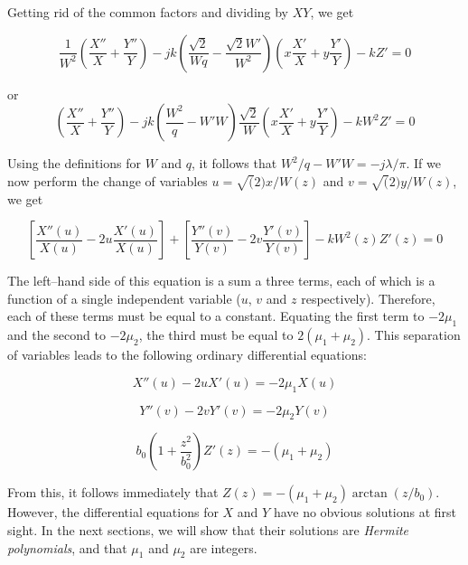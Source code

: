 Getting rid of the common factors and dividing by $XY$, we get

\begin{equation}
\frac{1}{W^2}\left(\frac{X''}{X}+\frac{Y''}{Y}\right)  
- j k \left(\frac{\sqrt{2}}{Wq} - \frac{\sqrt{2}W'}{W^2}\right)\left(x\frac{X'}{X}+y\frac{Y'}{Y}\right)
-kZ' = 0
\end{equation} 

or
\begin{equation}
\left(\frac{X''}{X}+\frac{Y''}{Y}\right)  
- j k  \left(\frac{W^2}{q} - W'W\right)\frac{\sqrt{2}}{W}\left(x\frac{X'}{X}+y\frac{Y'}{Y}\right)
-kW^2Z' = 0
\end{equation} 

Using the definitions for $W$ and $q$, it follows that $W^2/q - W'W = -j \lambda / \pi$. If we now perform the change of variables $u = \sqrt(2) x / W(z)$ and  $v = \sqrt(2) y / W(z)$, we get

\begin{equation}
\left[{\frac{X''(u)}{X(u)} - 2 u\frac{X'(u)}{X(u)}}\right] + 
\left[{\frac{Y''(v)}{Y(v)} - 2 v\frac{Y'(v)}{Y(v)}}\right] -kW^2(z)Z'(z) = 0
\end{equation} 

The left--hand side of this equation is a sum a three terms, each of which is a function of a single independent variable ($u$, $v$ and $z$ respectively). Therefore, each of these terms must be equal to a constant. Equating the first term to $-2\mu_1$ and the second to $-2\mu_2$, the third must be equal to $2(\mu_1+\mu_2)$. This separation of variables leads to the following ordinary differential equations:

\begin{equation}
X''(u) - 2 u X'(u) = - 2 \mu_1 X(u) \label{eq-diff-hermite-0}
\end{equation} 

\begin{equation}
Y''(v) - 2 v Y'(v) = - 2 \mu_2 Y(v)
\end{equation} 

\begin{equation}
b_0\left(1 + \frac{z^2}{b_0^2}\right)Z'(z) = -(\mu_1+\mu_2)
\end{equation} 

From this, it follows immediately that $Z(z) = -(\mu_1+\mu_2) \arctan(z/b_0)$. However, the differential equations for $X$ and $Y$ have no obvious solutions at first sight. In the next sections, we will show that their solutions are \emph{Hermite polynomials}, and that $\mu_1$ and $\mu_2$ are integers.

